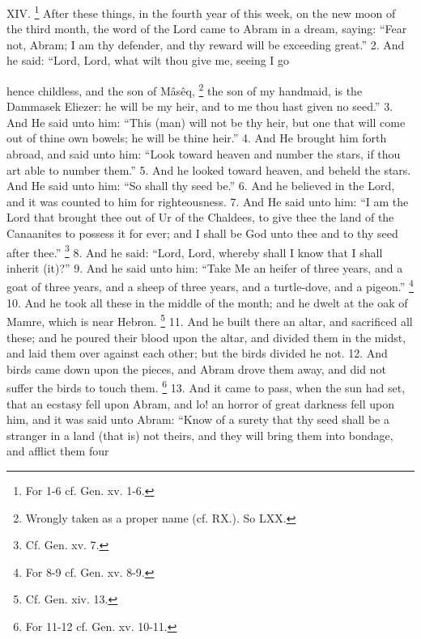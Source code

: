 XIV. \footnote{For 1-6 cf. Gen. xv. 1-6.} After these things, in the fourth year of this week, on the new moon of the third month, the word of the Lord came to Abram in a dream, saying: ``Fear not, Abram; I am thy defender, and thy reward will be exceeding great.'' 2. And he said: ``Lord, Lord, what wilt thou give me, seeing I go

hence childless, and the son of Mâsêq, \footnote{Wrongly taken as a proper name (cf. RX.). So LXX.} the son of my handmaid, is the Dammasek Eliezer: he will be my heir, and to me thou hast given no seed.'' 3. And He said unto him: ``This (man) will not be thy heir, but one that will come out of thine own bowels; he will be thine heir.'' 4. And He brought him forth abroad, and said unto him: ``Look toward heaven and number the stars, if thou art able to number them.'' 5. And he looked toward heaven, and beheld the stars. And He said unto him: ``So shall thy seed be.'' 6. And he believed in the Lord, and it was counted to him for righteousness. 7. And He said unto him: ``I am the Lord that brought thee out of Ur of the Chaldees, to give thee the land of the Canaanites to possess it for ever; and I shall be God unto thee and to thy seed after thee.'' \footnote{Cf. Gen. xv. 7.} 8. And he said: ``Lord, Lord, whereby shall I know that I shall inherit (it)?'' 9. And he said unto him: ``Take Me an heifer of three years, and a goat of three years, and a sheep of three years, and a turtle-dove, and a pigeon.'' \footnote{For 8-9 cf. Gen. xv. 8-9.} 10. And he took all these in the middle of the month; and he dwelt at the oak of Mamre, which is near Hebron. \footnote{Cf. Gen. xiv. 13.} 11. And he built there an altar, and sacrificed all these; and he poured their blood upon the altar, and divided them in the midst, and laid them over against each other; but the birds divided he not. 12. And birds came down upon the pieces, and Abram drove them away, and did not suffer the birds to touch them. \footnote{For 11-12 cf. Gen. xv. 10-11.} 13. And it came to pass, when the sun had set, that an ecstasy fell upon Abram, and lo! an horror of great darkness fell upon him, and it was said unto Abram: ``Know of a surety that thy seed shall be a stranger in a land (that is) not theirs, and they will bring them into bondage, and afflict them four

